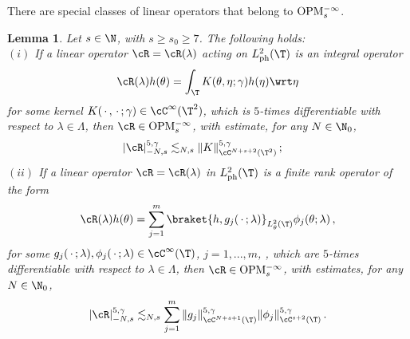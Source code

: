 \documentclass[a4paper,reqno,10pt]{article}
\newtheorem{lem}{Lemma}[section]
\newcommand{\OpM}{{\rm O}{\rm P}{\rm M}}
\begin{document}
There are special classes of linear operators that belong to $\OpM_{s}^{-\infty}$.
\begin{lem}\label{lemma.kernelHS}
	Let $s\in\N$, with $s\geq s_0\geqslant7$. The following holds:
	\\[1mm]
	\noindent $(i)$ If a linear operator $\cR=\cR(\lambda)$ acting on  $L_{\rm ph}^2(\T)$ is an integral operator
	\begin{equation}\label{kernel.gen}
		\cR(\lambda) h(\theta) = \int_{\T} K(\theta,\eta;\gamma) h(\eta) \wrt\eta
	\end{equation}
	for some kernel $K(\,\cdot\,,\,\cdot\,;\gamma)\in \cC^\infty(\T^2)$, which  is $5$-times differentiable with respect to $\lambda\in\Lambda$,  then $\cR\in \OpM_{s}^{-\infty}$, with estimate, for any $N\in\N_{0}$,
	\begin{align*}
		|\cR|_{-N,s}^{5,\gamma} &\lesssim_{N,s} \| K \|_{\cC^{N+s+2}(\T^2)}^{5,\gamma} \,;
	\end{align*}
	\noindent $(ii)$ If a linear operator $\cR=\cR(\lambda)$ in $L_{\rm ph}^2(\T)$ is a finite rank operator of the form
	\begin{equation}\label{finite.rank.gen}
		\cR(\lambda) h(\theta) = \sum_{j=1}^{m} \braket{h,g_j(\,\cdot\,;\lambda)}_{L_\theta^2(\T)} \phi_{j}(\theta;\lambda)\,,
	\end{equation}
	for some $g_j(\,\cdot\,;\lambda),\phi_{j}(\,\cdot\,;\lambda) \in \cC^{\infty}(\T)$, $j=1,...,m$, , which  are $5$-times differentiable with respect to $\lambda\in\Lambda$,  then $\cR\in \OpM_{s}^{-\infty}$, with estimates, for any $N\in\N_{0}$,
	\begin{equation}
		|\cR|_{-N,s}^{5,\gamma} \lesssim_{N,s} \sum_{j=1}^{m} \| g_j \|_{\cC^{N+s+1}(\T)}^{5,\gamma}  \| \phi_{j} \|_{\cC^{s+2}(\T)}^{5,\gamma}  \,.
	\end{equation}
\end{lem}
\end{document}
